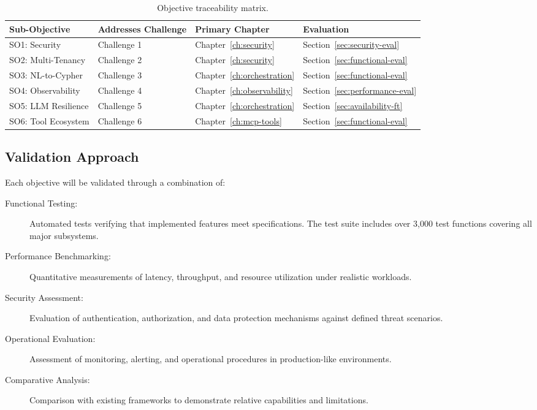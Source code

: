 \documentclass[a4paper,twoside]{sapthesis}
\begin{document}
\begin{table}[ht]
\centering
\caption{Objective traceability matrix.}
\label{tab:objective-traceability}
\small
\begin{tabular}{llll}
\hline
\textbf{Sub-Objective} & \textbf{Addresses Challenge} & \textbf{Primary Chapter} & \textbf{Evaluation} \\
\midrule
SO1: Security & Challenge 1 & Chapter~\ref{ch:security} & Section~\ref{sec:security-eval} \\
SO2: Multi-Tenancy & Challenge 2 & Chapter~\ref{ch:security} & Section~\ref{sec:functional-eval} \\
SO3: NL-to-Cypher & Challenge 3 & Chapter~\ref{ch:orchestration} & Section~\ref{sec:functional-eval} \\
SO4: Observability & Challenge 4 & Chapter~\ref{ch:observability} & Section~\ref{sec:performance-eval} \\
SO5: LLM Resilience & Challenge 5 & Chapter~\ref{ch:orchestration} & Section~\ref{sec:availability-ft} \\
SO6: Tool Ecosystem & Challenge 6 & Chapter~\ref{ch:mcp-tools} & Section~\ref{sec:functional-eval} \\
\midrule
\end{tabular}
\end{table}

\subsection{Validation Approach}

Each objective will be validated through a combination of:

\begin{description}
    \item[Functional Testing:] Automated tests verifying that implemented features meet specifications. The test suite includes over 3,000 test functions covering all major subsystems.
    
    \item[Performance Benchmarking:] Quantitative measurements of latency, throughput, and resource utilization under realistic workloads.
    
    \item[Security Assessment:] Evaluation of authentication, authorization, and data protection mechanisms against defined threat scenarios.
    
    \item[Operational Evaluation:] Assessment of monitoring, alerting, and operational procedures in production-like environments.
    
    \item[Comparative Analysis:] Comparison with existing frameworks to demonstrate relative capabilities and limitations.
\end{description}
\end{document}
